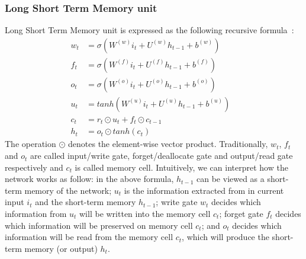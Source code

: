 \subsubsection{Long Short Term Memory unit}\label{sec:lstm}
Long Short Term Memory unit is expressed as the following recursive formula~\cite{treeLSTM}:
\begin{align}
w_t &= \sigma\left(W^{(w)}i_t + U^{(w)}h_{t-1} + b^{(w)}\right) \label{eq:lstm-input-gate}&\\
f_t &= \sigma\left(W^{(f)}i_t + U^{(f)}h_{t-1} + b^{(f)}\right) \label{eq:lstm-forget-gate}&\\
o_t &= \sigma\left(W^{(o)}i_t + U^{(o)}h_{t-1} + b^{(o)}\right) \label{eq:lstm-output-gate}&\\
u_t &= tanh\left(W^{(u)}i_t + U^{(u)}h_{t-1} + b^{(u)}\right) \label{eq:lstm-update-gate}&\\
c_t &= r_t \odot u_t + f_t \odot c_{t-1} \label{eq:longterm-mem}&\\
h_t &= o_t \odot tanh(c_t) \label{eq:temperal-mem}&
\end{align}
The operation \(\odot\) denotes the element-wise vector product.
Traditionally, \(w_t\), \(f_t\) and \(o_t\) are called input/write gate, forget/deallocate gate and output/read gate respectively and \(c_t\) is called memory cell.
Intuitively, we can interpret how the network works as follow:
in the above formula, \(h_{t-1}\) can be viewed as a short-term memory of the network;
\(u_t\) is the information extracted from in current input \(i_t\) and the short-term memory \(h_{t-1}\);
write gate \(w_t\) decides which information from \(u_t\) will be written into the memory cell \(c_t\);
forget gate \(f_t\) decides which information will be preserved on memory cell \(c_t\);
and \(o_t\) decides which information will be read from the memory cell \(c_t\), which will produce the short-term memory (or output) \(h_t\).
